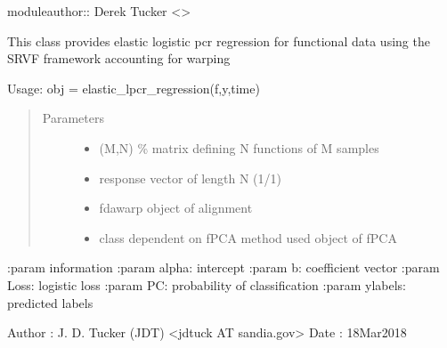 \documentclass[letterpaper,10pt,english]{sphinxmanual}
\begin{document}
moduleauthor:: Derek Tucker \textless{}\textgreater{}

\begin{fulllineitems}
\label{\detokenize{pcr_regression:pcr_regression.elastic_lpcr_regression}}
This class provides elastic logistic pcr regression for functional 
data using the SRVF framework accounting for warping

Usage:  obj = elastic\_lpcr\_regression(f,y,time)
\begin{quote}\begin{description}
\item[{Parameters}] \leavevmode\begin{itemize}
\item {} 
 \textendash{} (M,N) \% matrix defining N functions of M samples

\item {} 
 \textendash{} response vector of length N (\sphinxhyphen{}1/1)

\item {} 
 \textendash{} fdawarp object of alignment

\item {} 
 \textendash{} class dependent on fPCA method used object of fPCA

\end{itemize}

\end{description}\end{quote}

:param information
:param alpha: intercept
:param b: coefficient vector
:param Loss: logistic loss
:param PC: probability of classification
:param ylabels: predicted labels

Author :  J. D. Tucker (JDT) \textless{}jdtuck AT sandia.gov\textgreater{}
Date   :  18\sphinxhyphen{}Mar\sphinxhyphen{}2018


\end{fulllineitems}
\end{document}
